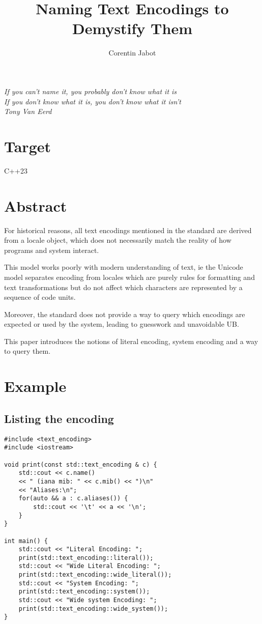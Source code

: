 \documentclass{wg21}
\title{Naming Text Encodings to Demystify Them}
\author{Corentin Jabot}{corentin.jabot@gmail.com}
\begin{document}
\maketitle

\begin{flushright}
    \hfill \break
    \hfill \break
    \textit{If you can't name it, you probably don't know what it is\\
    	If you don't know what it is, you don't know what it isn't\\
    	Tony Van Eerd}
\end{flushright}


\section{Target}

C++23

\section{Abstract}

For historical reasons, all text encodings mentioned in the standard are derived from
a locale object, which does not necessarily match the reality of how programs and system interact.

This model works poorly with modern understanding of text, ie the Unicode model separates encoding
from locales which are purely rules for formatting and text transformations but do not affect
which characters are represented by a sequence of code units.

Moreover, the standard does not provide a way to query which encodings are expected or used by the system,
leading to guesswork and unavoidable UB.

This paper introduces the notions of literal encoding, system encoding and a way to query them.


\section{Example}

\subsection{Listing the encoding}

\begin{lstlisting}[style=MY]
#include <text_encoding>
#include <iostream>

void print(const std::text_encoding & c) {
    std::cout << c.name()
    << " (iana mib: " << c.mib() << ")\n"
    << "Aliases:\n";
    for(auto && a : c.aliases()) {
        std::cout << '\t' << a << '\n';
    }
}

int main() {
    std::cout << "Literal Encoding: ";
    print(std::text_encoding::literal());
    std::cout << "Wide Literal Encoding: ";
    print(std::text_encoding::wide_literal());
    std::cout << "System Encoding: ";
    print(std::text_encoding::system());
    std::cout << "Wide system Encoding: ";
    print(std::text_encoding::wide_system());
}
\end{lstlisting}
\end{document}
